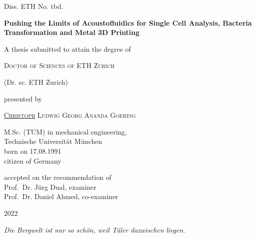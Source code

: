 \begin{titlepage}
{Diss. ETH No. tbd. \vspace{2.5cm}}
\begin{center}
\LARGE{\textbf{Pushing the Limits of Acoustofluidics for Single Cell Analysis, 
Bacteria Transformation and Metal 3D Printing}}
\end{center}
\vspace{2.0cm}
\begin{center}
{A thesis submitted to attain the degree of}
\end{center}
\begin{center}
{\textsc{Doctor of Sciences of ETH Zurich}}
\end{center}
\begin{center}
{(Dr. sc. ETH Zurich)} \end{center}
\vspace{2.0cm}
\begin{center}
{presented by}
\end{center}
\begin{center}
  {\textsc{\underline{Christoph} Ludwig Georg Ananda Goering}}
\end{center}
\begin{center}
{M.Sc. (TUM) in mechanical engineering,\\
Technische Universit\"at M\"unchen\\
born on 17.08.1991 \\
citizen of Germany}
\end{center}
\vspace{1cm}
\begin{center}
{accepted on the recommendation of \\ \vspace{0.3cm}
Prof.\ Dr. J\"urg Dual, examiner \\
Prof.\ Dr. Daniel Ahmed, co-examiner}
\end{center}
\vspace{1cm}
\begin{center}
2022
\end{center}

\cleardoublepage
\thispagestyle{empty}
\vspace*{5.0cm}

\begin{center}
\vspace*{0.5cm}
\textit{Die Bergwelt ist nur so schön, weil Täler dazwischen liegen.}



\end{center}


\cleardoublepage
\end{titlepage}
